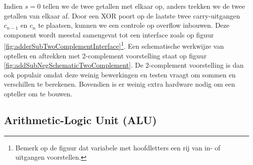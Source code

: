 Indien $s=0$ tellen we de twee getallen met elkaar op, anders trekken we de twee getallen van elkaar af. Door een XOR poort op de laatste twee carry-uitgangen $c_{n-1}$ en $c_n$ te plaatsen, kunnen we een controle op overflow inbouwen. Deze component wordt meestal samengevat tot een interface zoals op figuur \ref{fig:adderSubTwoComplementInterface}\footnote{Bemerk op de figuur dat variabele met hoofdletters een rij van in- of uitgangen voorstellen.}. Een schematische werkwijze van optellen en aftrekken met 2-complement voorstelling staat op figuur \ref{fig:addSubNegSchematicTwoComplement}. De 2-complement voorstelling is dan ook populair omdat deze weinig bewerkingen en testen vraagt om sommen en verschillen te berekenen. Bovendien is er weinig extra hardware nodig om een opteller om te bouwen.
\subsection{Arithmetic-Logic Unit (ALU)}
